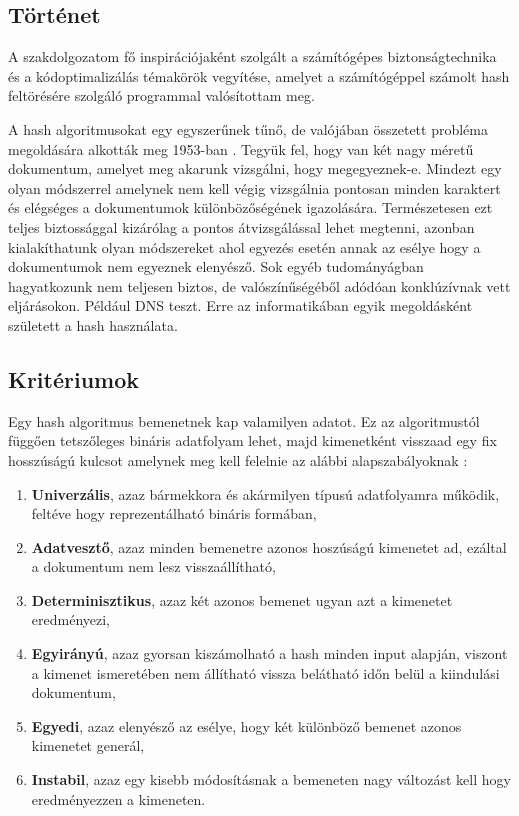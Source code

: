 \subsection{Történet}

A szakdolgozatom fő inspirációjaként szolgált a számítógépes biztonságtechnika és a kódoptimalizálás témakörök vegyítése, amelyet a számítógéppel számolt hash feltörésére szolgáló programmal valósítottam meg.

A hash algoritmusokat egy egyszerűnek tűnő, de valójában összetett probléma megoldására alkották meg 1953-ban \cite{dang2015secure}. Tegyük fel, hogy van két nagy méretű dokumentum, amelyet meg akarunk vizsgálni, hogy megegyeznek-e. Mindezt egy olyan módszerrel amelynek nem kell végig vizsgálnia pontosan minden karaktert és elégséges a dokumentumok különbözőségének igazolására. Természetesen ezt teljes biztossággal kizárólag a pontos átvizsgálással lehet megtenni, azonban kialakíthatunk olyan módszereket ahol egyezés esetén annak az esélye hogy a dokumentumok nem egyeznek elenyésző. Sok egyéb tudományágban hagyatkozunk nem teljesen biztos, de valószínűségéből adódóan konklúzívnak vett eljárásokon. Például DNS teszt. Erre az informatikában egyik megoldásként született a hash használata.


\subsection{Kritériumok}
\label{sec:criteries}

Egy hash algoritmus bemenetnek kap valamilyen adatot. Ez az algoritmustól függően tetszőleges bináris adatfolyam lehet, majd kimenetként visszaad egy fix hosszúságú kulcsot amelynek meg kell felelnie az alábbi alapszabályoknak \cite{preneel1993analysis}:

\begin{enumerate}
  \item \textbf{Univerzális}, azaz bármekkora és akármilyen típusú adatfolyamra működik, feltéve hogy reprezentálható bináris formában,
  \item \textbf{Adatvesztő}, azaz minden bemenetre azonos hoszúságú kimenetet ad, ezáltal a dokumentum nem lesz visszaállítható,
  \item \textbf{Determinisztikus}, azaz két azonos bemenet ugyan azt a kimenetet eredményezi,
  \item \textbf{Egyirányú}, azaz gyorsan kiszámolható a hash minden input alapján, viszont a kimenet ismeretében nem állítható vissza belátható időn belül a kiindulási dokumentum,
  \item \textbf{Egyedi}, azaz elenyésző az esélye, hogy két különböző bemenet azonos kimenetet generál,
  \item \textbf{Instabil}, azaz egy kisebb módosításnak a bemeneten nagy változást kell hogy eredményezzen a kimeneten.
\end{enumerate}

